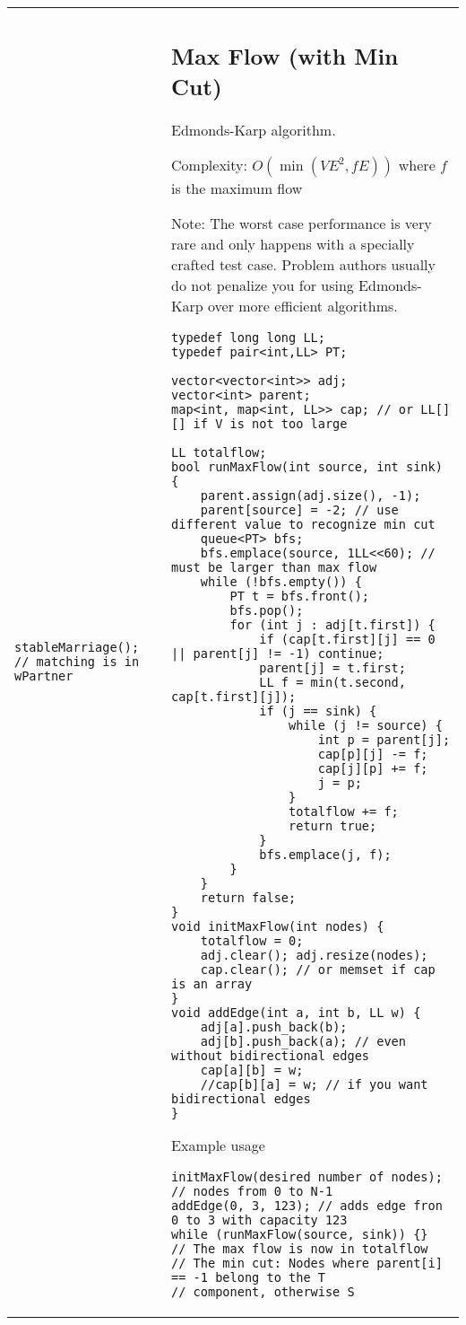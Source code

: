 \documentclass[letterpaper]{article}
\begin{document}
\begin{tabular}{@{}p{7.5cm}p{10.5cm}@{}}
\begin{lstlisting}
stableMarriage(); // matching is in wPartner
\end{lstlisting}

&
\subsection{Max Flow (with Min Cut)}

Edmonds-Karp algorithm.

Complexity: $O\left(\min\left(VE^2, fE\right)\right)$ where $f$ is the maximum flow

Note: The worst case performance is very rare and only happens with a specially crafted test case. Problem authors usually do not penalize you for using Edmonds-Karp over more efficient algorithms.

\begin{lstlisting}
typedef long long LL;
typedef pair<int,LL> PT;

vector<vector<int>> adj;
vector<int> parent;
map<int, map<int, LL>> cap; // or LL[][] if V is not too large

LL totalflow;
bool runMaxFlow(int source, int sink) {
	parent.assign(adj.size(), -1);
	parent[source] = -2; // use different value to recognize min cut
	queue<PT> bfs;
	bfs.emplace(source, 1LL<<60); // must be larger than max flow
	while (!bfs.empty()) {
		PT t = bfs.front();
		bfs.pop();
		for (int j : adj[t.first]) {
			if (cap[t.first][j] == 0 || parent[j] != -1) continue;
			parent[j] = t.first;
			LL f = min(t.second, cap[t.first][j]);
			if (j == sink) {
				while (j != source) {
					int p = parent[j];
					cap[p][j] -= f;
					cap[j][p] += f;
					j = p;
				}
				totalflow += f;
				return true;
			}
			bfs.emplace(j, f);
		}
	}
	return false;
}
void initMaxFlow(int nodes) {
	totalflow = 0;
	adj.clear(); adj.resize(nodes);
	cap.clear(); // or memset if cap is an array
}
void addEdge(int a, int b, LL w) {
	adj[a].push_back(b);
	adj[b].push_back(a); // even without bidirectional edges
	cap[a][b] = w;
	//cap[b][a] = w; // if you want bidirectional edges
}
\end{lstlisting}
Example usage
\begin{lstlisting}
initMaxFlow(desired number of nodes); // nodes from 0 to N-1
addEdge(0, 3, 123); // adds edge fron 0 to 3 with capacity 123
while (runMaxFlow(source, sink)) {}
// The max flow is now in totalflow
// The min cut: Nodes where parent[i] == -1 belong to the T
// component, otherwise S
\end{lstlisting}
\end{tabular}
\end{document}
